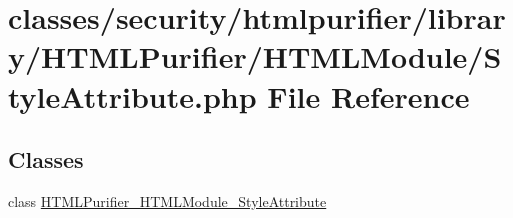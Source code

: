\hypertarget{StyleAttribute_8php}{\section{classes/security/htmlpurifier/library/\+H\+T\+M\+L\+Purifier/\+H\+T\+M\+L\+Module/\+Style\+Attribute.php File Reference}
\label{StyleAttribute_8php}
}
\subsection*{Classes}
\begin{DoxyCompactItemize}
\item 
class \hyperlink{classHTMLPurifier__HTMLModule__StyleAttribute}{H\+T\+M\+L\+Purifier\+\_\+\+H\+T\+M\+L\+Module\+\_\+\+Style\+Attribute}
\end{DoxyCompactItemize}
